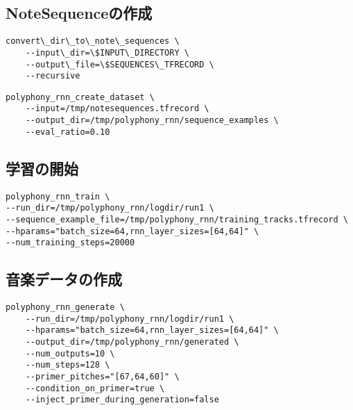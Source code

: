 \subsection{NoteSequenceの作成}
\begin{lstlisting}[basicstyle=\ttfamily\footnotesize,frame=single]
    convert\_dir\_to\_note\_sequences \
    --input\_dir=\$INPUT\_DIRECTORY \
    --output\_file=\$SEQUENCES\_TFRECORD \
    --recursive
\end{lstlisting}
\begin{lstlisting}[basicstyle=\ttfamily\footnotesize,frame=single]
    polyphony_rnn_create_dataset \
    --input=/tmp/notesequences.tfrecord \
    --output_dir=/tmp/polyphony_rnn/sequence_examples \
    --eval_ratio=0.10
    \end{lstlisting}
\subsection{学習の開始}
\begin{lstlisting}[basicstyle=\ttfamily\footnotesize,frame=single]
polyphony_rnn_train \
--run_dir=/tmp/polyphony_rnn/logdir/run1 \
--sequence_example_file=/tmp/polyphony_rnn/training_tracks.tfrecord \
--hparams="batch_size=64,rnn_layer_sizes=[64,64]" \
--num_training_steps=20000
\end{lstlisting}
\subsection{音楽データの作成}
\begin{lstlisting}[basicstyle=\ttfamily\footnotesize,frame=single]
    polyphony_rnn_generate \
    --run_dir=/tmp/polyphony_rnn/logdir/run1 \
    --hparams="batch_size=64,rnn_layer_sizes=[64,64]" \
    --output_dir=/tmp/polyphony_rnn/generated \
    --num_outputs=10 \
    --num_steps=128 \
    --primer_pitches="[67,64,60]" \
    --condition_on_primer=true \
    --inject_primer_during_generation=false
\end{lstlisting}
